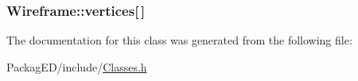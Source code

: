 \subsubsection[{\texorpdfstring{vertices}{vertices}}]{ Wireframe\+::vertices\mbox{[}$\,$\mbox{]}}\hypertarget{class_wireframe_aabbceba0ec194b6ec51c6881a97cd46a}{}\label{class_wireframe_aabbceba0ec194b6ec51c6881a97cd46a}


The documentation for this class was generated from the following file\+:\begin{DoxyCompactItemize}
\item 
Packag\+E\+D/include/\hyperlink{_classes_8h}{Classes.\+h}\end{DoxyCompactItemize}
